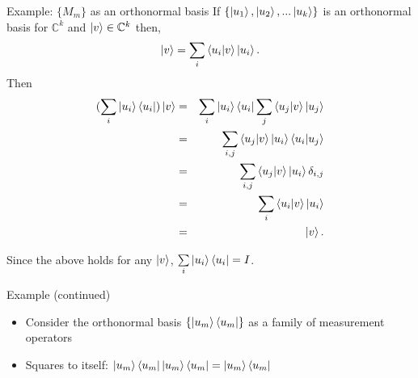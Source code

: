\documentclass[handout, 10 pt]{beamer}
\begin{document}
\begin{frame}{Example: $\{M_m\}$ as an orthonormal basis }
 If $\{\ket{u_1}, \ket{u_2}, ...\ket{u_k}\}$ is an orthonormal basis for ${\mathbb{C}}^k$ and $\ket{v} \in {\mathbb{C}}^k$ then, 
$$\ket{v}=\sum\limits_i\braket{u_i|v}\ket{u_i} .$$
Then
\begin{eqnarray*}
    (\sum_i \ket{u_i}\bra{u_i})\ket{v}&=&
    \sum_i \ket{u_i}\bra{u_i}\sum_j \braket{u_j|v} \ket{u_j}\\
    &=& \sum_{i,j}\braket{u_j|v}\ket{u_i}\braket{u_i|u_j}\\
    &=& \sum_{i,j}\braket{u_j|v}\ket{u_i}\delta_{i,j}\\
    &=&\sum_i \braket{u_i|v}\ket{u_i}\\
    &=&\ket{v}.
\end{eqnarray*}

Since the above holds for any $\ket{v}$, $\sum\limits_i \ket{u_i}\bra{u_i}=I$.   
\end{frame}

\begin{frame}{Example (continued)}
\begin{itemize}
    \item Consider the orthonormal basis $\{\ket{u_m}\bra{u_m}\}$ as a family of measurement operators 
    \pause
    \item Squares to itself: 
    $\ket{u_m}\bra{u_m} \ket{u_m}\bra{u_m}=\ket{u_m}\bra{u_m}$
\end{itemize}
\end{frame}

\end{document}
